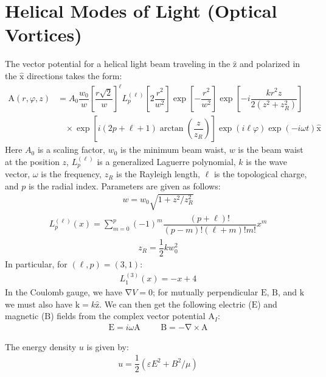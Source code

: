 \documentclass[10pt]{article}
\newcommand{\psl}{6pt} %
\newcommand{\f}[2]{\dfrac{#1}{#2}} %
\newcommand{\p}[1]{\left(#1\right)} %
\renewcommand{\sp}[1]{\left[#1\right]} %
\renewcommand{\epsilon}{\varepsilon} %
\renewcommand{\phi}{\varphi} %
\renewcommand{\v}[1]{\boldsymbol{\mathrm{#1}}} %
\newcommand{\uv}[1]{\hat{\boldsymbol{\mathrm{#1}}}} %
\newcommand{\del}{\v\nabla} %
\begin{document}
\titlespacing{\section}{0pt}{\psl}{0pt}
\section*{Helical Modes of Light (Optical Vortices)}


The vector potential for a helical light beam traveling in the $\uv z$
and polarized in the $\uv x$ directions takes the form:
\begin{align*}
  \v A\p{r,\phi,z}&=A_0\f{w_0}{w}\sp{\f{r\sqrt 2}{w}}^\ell
  L^{\p{\ell}}_p\sp{2\f{r^2}{w^2}}\exp\sp{-\f{r^2}{w^2}}
  \exp\sp{-i\f{kr^2z}{2\p{z^2+z_R^2}}} \\
  &~~~~\times\exp\sp{i\p{2p+\ell+1}\arctan\p{\f z{z_R}}}
  \exp\p{i\ell\phi}\exp\p{-i\omega t} \uv x
\end{align*}
Here $A_0$ is a scaling factor, $w_0$ is the minimum beam waist, $w$
is the beam waist at the position $z$, $L^{\p{\ell}}_p$ is a
generalized Laguerre polynomial, $k$ is the wave vector, $\omega$ is
the frequency, $z_R$ is the Rayleigh length, $\ell$ is the topological
charge, and $p$ is the radial index. Parameters are given as follows:
\begin{align*}
  w=w_0\sqrt{1+z^2/z_R^2}
\end{align*}
\begin{align*}
  L^{\p{\ell}}_p\p{x}
  =\sum_{m=0}^p\p{-1}^m\f{\p{p+\ell}!}{\p{p-m}!\p{\ell+m}!m!}x^m
\end{align*}
\begin{align*}
  z_R=\f12 kw_0^2
\end{align*}
In particular, for $\p{\ell,p}=\p{3,1}$:
\begin{align*}
  L^{\p{3}}_1\p{x}=-x+4
\end{align*}
In the Coulomb gauge, we have $\del V=0$; for mutually perpendicular
$\v E$, $\v B$, and $\v k$ we must also have $\v k=k\uv z$. We can
then get the following electric ($\v E$) and magnetic ($\v B$) fields
from the complex vector potential $\v A_I$:
\begin{align*}
  \v E=i\omega\v A &&& \v B=-\del \times\v A
\end{align*}

The energy density $u$ is given by:
\begin{align*}
  u=\f12\p{\epsilon E^2+B^2/\mu} 
\end{align*}
\end{document}
